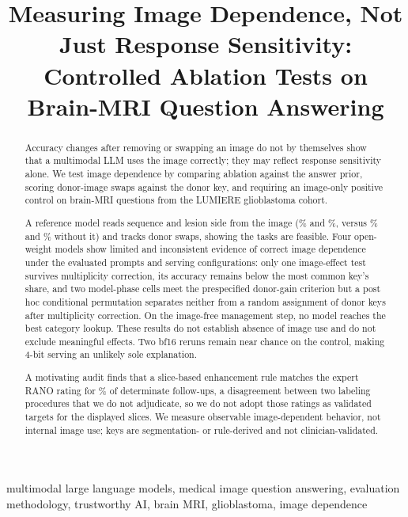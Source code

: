\documentclass[conference]{IEEEtran}
\title{Measuring Image Dependence, Not Just Response Sensitivity: Controlled Ablation Tests on Brain-MRI Question Answering}
\author{\IEEEauthorblockN{Anonymous Submission}}
\begin{document}
\maketitle

\begin{abstract}
Accuracy changes after removing or swapping an image do not by themselves show that a multimodal LLM uses the image correctly; they may reflect response sensitivity alone. We test image dependence by comparing ablation against the answer prior, scoring donor-image swaps against the donor key, and requiring an image-only positive control on brain-MRI questions from the LUMIERE glioblastoma cohort.

A reference model reads sequence and lesion side from the image (\vfourEoneOwnAIAGemini{}\% and \vfourEoneOwnLILGemini{}\%, versus \vfourEoneTextAIAGemini{}\% and \vfourEoneTextLILGemini{}\% without it) and tracks donor swaps, showing the tasks are feasible. Four open-weight models show limited and inconsistent evidence of correct image dependence under the evaluated prompts and serving configurations: only one image-effect test survives multiplicity correction, its accuracy remains below the most common key's share, and two model-phase cells meet the prespecified donor-gain criterion but a post hoc conditional permutation separates neither from a random assignment of donor keys after multiplicity correction. On the image-free management step, no model reaches the best category lookup. These results do not establish absence of image use and do not exclude meaningful effects. Two bf16 reruns remain near chance on the control, making 4-bit serving an unlikely sole explanation.

A motivating audit finds that a slice-based enhancement rule matches the expert RANO rating for \vfourConcordantDetPct{}\% of \vfourDeterminate{} determinate follow-ups, a disagreement between two labeling procedures that we do not adjudicate, so we do not adopt those ratings as validated targets for the displayed slices. We measure observable image-dependent behavior, not internal image use; keys are segmentation- or rule-derived and not clinician-validated.
\end{abstract}

\begin{IEEEkeywords}
multimodal large language models, medical image question answering, evaluation methodology, trustworthy AI, brain MRI, glioblastoma, image dependence
\end{IEEEkeywords}
\end{document}
